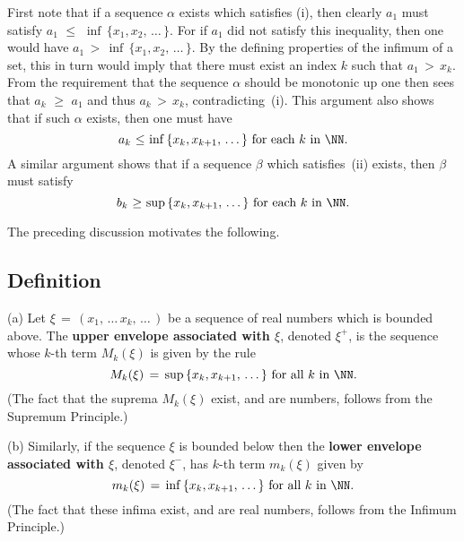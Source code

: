 {        First note that if a sequence ${\alpha}$ exists which satisfies (i), then clearly $a_{1}$ must satisfy $a_{1}\,\,{\leq}\,\,{\inf}\,\{x_{1},x_{2},\,{\ldots}\,\}$.
    For if $a_{1}$ did not satisfy this inequality, then one would have $a_{1}\,>\,{\inf}\,\{x_{1},x_{2},\,{\ldots}\,\}$.
    By the defining properties of the infimum of a set, this in turn would imply that there must exist an index $k$ such that $a_{1}\,>\,x_{k}$.
    From the requirement that the sequence ${\alpha}$ should be monotonic up one then sees that $a_{k}\,\,{\geq}\,\,a_{1}$ and thus $a_{k}\,>\,x_{k}$, contradicting~(i).
    This argument also shows that if such ${\alpha}$ exists, then one must have
        \begin{displaymath}
        a_{k}\,\,{\leq}\,\,{\inf}\,\{x_{k},x_{k+1},\,{\ldots}\,\} \mbox{ for each $k$ in ${\NN}$}.
        \end{displaymath}
   A similar argument shows that if a sequence ${\beta}$ which satisfies~(ii) exists, then ${\beta}$ must satisfy
        \begin{displaymath}
        b_{k}\,\,{\geq}\,\,{\sup}\,\{x_{k},x_{k+1},\,{\ldots}\,\} \mbox{ for each $k$ in ${\NN}$}.
        \end{displaymath}

        The preceding discussion motivates the following.


\V

            \subsection{\small{\bf Definition}}
            \label{DefC50.40}

        (a) Let ${\xi} \,=\, (x_{1},\,{\ldots}\,x_{k},\,{\ldots}\,)$ be a sequence of real numbers which is bounded above.
    The {\bf upper envelope associated with ${\xi}$}, denoted ${\xi}^{+}$, is the sequence whose $k$-th term $M_{k}({\xi})$ is given by the rule
        \begin{displaymath}
        M_{k}({\xi}) \,=\, {\sup}\,\{x_{k},x_{k+1},\,{\ldots}\,\} \mbox{ for all $k$ in ${\NN}$}.
        \end{displaymath}
    (The fact that the suprema $M_{k}({\xi})$ exist, and are numbers, follows from the Supremum Principle.)

\V


         (b) Similarly, if the sequence ${\xi}$ is bounded below then the {\bf lower envelope associated with ${\xi}$},
    denoted ${\xi}^{-}$, has $k$-th term $m_{k}({\xi})$ given by
        \begin{displaymath}
        m_{k}({\xi}) \,=\, {\inf}\,\{x_{k},x_{k+1},\,{\ldots}\,\} \mbox{ for all $k$ in ${\NN}$}.
        \end{displaymath}
    (The fact that these infima exist, and are real numbers, follows from the Infimum Principle.)


}
